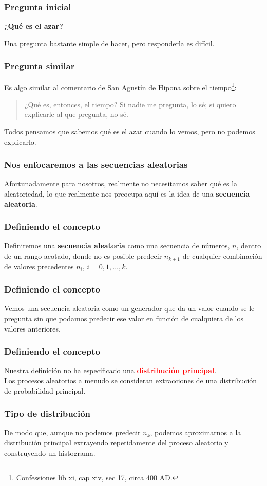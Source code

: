 \documentclass[12pt]{beamer}
\begin{document}
\begin{frame}
\frametitle{Pregunta inicial}
\begin{center}
\textbf{\textcolor{ao}{¿Qué es el azar?}}
\end{center}
\pause
Una pregunta bastante simple de hacer, pero responderla es difícil.
\end{frame}
\begin{frame}[fragile]
\frametitle{Pregunta similar}
Es algo similar al comentario de San Agustín de Hipona sobre el tiempo{\footnote{Confessiones lib xi, cap xiv, sec 17, circa 400 AD.}}:
\\
\pause
\begin{quote}
¿Qué es, entonces, el tiempo? Si nadie me pregunta, lo sé; si quiero explicarle al que pregunta, no sé.
\end{quote}
\pause
Todos pensamos que sabemos qué es el azar cuando lo vemos, pero no podemos explicarlo.
\end{frame} 
\begin{frame}
\frametitle{Nos enfocaremos a las secuencias aleatorias}
Afortunadamente para nosotros, realmente no necesitamos saber qué es la aleatoriedad, lo que realmente nos preocupa aquí es la idea de una \textbf{\textcolor{armygreen}{secuencia aleatoria}}.
\end{frame}
\begin{frame}
\frametitle{Definiendo el concepto}
Definiremos una \textbf{secuencia aleatoria} como una secuencia de números, $n$, dentro de un rango acotado, donde no es posible predecir $n_{k+1}$ de cualquier combinación de valores precedentes $n_{i}, \, i = 0, 1, \ldots, k$.
\end{frame}
\begin{frame}
\frametitle{Definiendo el concepto}
Vemos una secuencia aleatoria como un generador que da un valor cuando se le pregunta sin que podamos predecir ese valor en función de cualquiera de los valores anteriores.
\end{frame}
\begin{frame}
\frametitle{Definiendo el concepto}
Nuestra definición no ha especificado una \textbf{\textcolor{red}{distribución principal}}.
\\
\bigskip
\pause
Los procesos aleatorios a menudo se consideran extracciones de una distribución de probabilidad principal.
\end{frame}
\begin{frame}
\frametitle{Tipo de distribución}
De modo que, aunque no podemos predecir $n_{k}$, \pause podemos aproximarnos a la distribución principal extrayendo repetidamente del proceso aleatorio y construyendo un histograma.
\end{frame}
\end{document}

